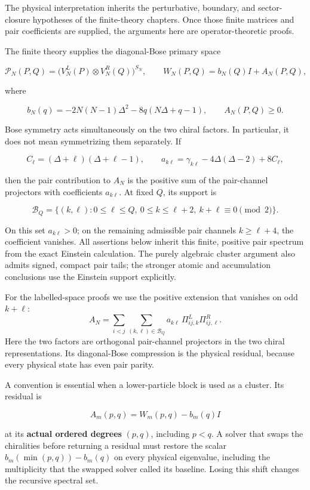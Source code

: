 \documentclass[a4paper,11pt]{article}
\numberwithin{equation}{section}
\begin{document}
The physical interpretation inherits the perturbative, boundary, and sector-closure hypotheses of the finite-theory chapters. Once those finite matrices and pair coefficients are supplied, the arguments here are operator-theoretic proofs.

The finite theory supplies the diagonal-Bose primary space

\[
\mathcal P_N(P,Q)=\bigl(V_N^L(P)\otimes V_N^R(Q)\bigr)^{S_N},
\qquad W_N(P,Q)=b_N(Q)I+A_N(P,Q),
\]

where

\[
b_N(q)=-2N(N-1)\Delta^2-8q(N\Delta+q-1),\qquad A_N(P,Q)\geq0.
\]

Bose symmetry acts simultaneously on the two chiral factors. In particular, it does not mean symmetrizing them separately. If

\[
C_\ell=(\Delta+\ell)(\Delta+\ell-1),\qquad
 a_{k\ell}=\gamma_{k\ell}-4\Delta(\Delta-2)+8C_\ell,
\]

then the pair contribution to \(A_N\) is the positive sum of the pair-channel projectors with coefficients \(a_{k\ell}\). At fixed \(Q\), its support is

\[
\mathcal B_Q=\{(k,\ell):0\leq\ell\leq Q,\ 0\leq k\leq\ell+2,
\ k+\ell\equiv0\pmod2\}.
\]

On this set \(a_{k\ell}>0\); on the remaining admissible pair channels \(k\geq\ell+4\), the coefficient vanishes. All assertions below inherit this finite, positive pair spectrum from the exact Einstein calculation. The purely algebraic cluster argument also admits signed, compact pair tails; the stronger atomic and accumulation conclusions use the Einstein support explicitly.

For the labelled-space proofs we use the positive extension that vanishes on odd \(k+\ell\): \[
A_N=\sum_{i<j}\sum_{(k,\ell)\in\mathcal B_Q}
a_{k\ell}\,\Pi^L_{ij,k}\Pi^R_{ij,\ell}.
\] Here the two factors are orthogonal pair-channel projectors in the two chiral representations. Its diagonal-Bose compression is the physical residual, because every physical state has even pair parity.

A convention is essential when a lower-particle block is used as a cluster. Its residual is

\[
A_m(p,q)=W_m(p,q)-b_m(q)I
\tag{CL.1}
\]

at its \textbf{actual ordered degrees} \((p,q)\), including \(p<q\). A solver that swaps the chiralities before returning a residual must restore the scalar \(b_m(\min(p,q))-b_m(q)\) on every physical eigenvalue, including the multiplicity that the swapped solver called its baseline. Losing this shift changes the recursive spectral set.
\end{document}
